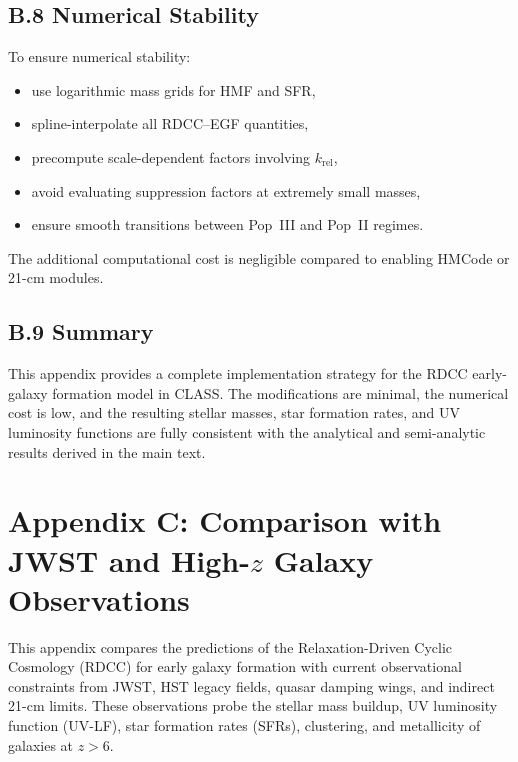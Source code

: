 \documentclass[11pt,a4paper]{article}
\begin{document}
\subsection*{B.8 Numerical Stability}

To ensure numerical stability:

\begin{itemize}
    \item use logarithmic mass grids for HMF and SFR,
    \item spline-interpolate all RDCC–EGF quantities,
    \item precompute scale-dependent factors involving $k_{\mathrm{rel}}$,
    \item avoid evaluating suppression factors at extremely small masses,
    \item ensure smooth transitions between Pop~III and Pop~II regimes.
\end{itemize}

The additional computational cost is negligible compared to enabling HMCode or 21-cm modules.

\subsection*{B.9 Summary}

This appendix provides a complete implementation strategy for the RDCC early-galaxy formation 
model in CLASS. The modifications are minimal, the numerical cost is low, and the resulting 
stellar masses, star formation rates, and UV luminosity functions are fully consistent with 
the analytical and semi-analytic results derived in the main text.

\section*{Appendix C: Comparison with JWST and High-$z$ Galaxy Observations}

This appendix compares the predictions of the Relaxation-Driven Cyclic Cosmology (RDCC) for 
early galaxy formation with current observational constraints from JWST, HST legacy fields, 
quasar damping wings, and indirect 21-cm limits. These observations probe the stellar mass 
buildup, UV luminosity function (UV-LF), star formation rates (SFRs), clustering, and 
metallicity of galaxies at $z > 6$.
\end{document}
